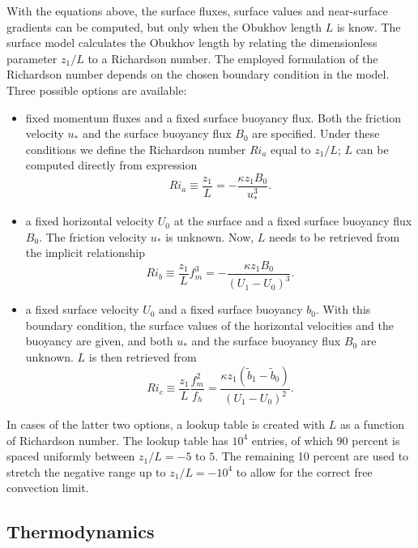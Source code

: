 \documentclass[gmd]{copernicus}
\begin{document}
With the equations above, the surface fluxes, surface values and near-surface gradients can be computed, but only when the Obukhov length $L$ is know. The surface model calculates the Obukhov length by relating the dimensionless parameter $z_1/ L$ to a Richardson number. The employed formulation of the Richardson number depends on the chosen boundary condition in the model. Three possible options are available:
\begin{itemize}
	\item fixed momentum fluxes and a fixed surface buoyancy flux. Both the friction velocity $u_*$ and the surface buoyancy flux $B_0$ are specified. Under these conditions we define the Richardson number $Ri_a$ equal to $z_1/L$; $L$ can be computed directly from expression
	\begin{equation}
	Ri_a \equiv \dfrac{z_1}{L} = - \dfrac{\kappa z_1 B_0}{u_*^3}.
	\end{equation}
	\item a fixed horizontal velocity $U_0$ at the surface and a fixed surface buoyancy flux $B_0$. The friction velocity $u_*$ is unknown. Now,  $L$ needs to be retrieved from the implicit relationship 
	\begin{equation}
	Ri_b \equiv \dfrac{z_1}{L} f_m^3 = - \dfrac{\kappa z_1 B_0}{ \left(U_1 - U_0 \right)^3}.
	\end{equation}
	\item a fixed surface velocity $U_0$ and a fixed surface buoyancy $b_0$. With this boundary condition, the surface values of the horizontal velocities and the buoyancy are given, and both $u_*$ and the surface buoyancy flux $B_0$ are unknown. $L$ is then retrieved from
	\begin{equation}
	Ri_c \equiv \dfrac{z_1}{L} \dfrac{f_m^2}{f_h} = \dfrac{\kappa z_1 \left(\widetilde{b}_1 - \widetilde{b}_0 \right)}{ \left(U_1 - U_0 \right)^2}.
	\end{equation}
\end{itemize}
In cases of the latter two options, a lookup table is created  with $L$ as a function of Richardson number. The lookup table has $10^4$ entries, of which 90 percent is spaced uniformly between $z_1/L = -5$ to $5$. The remaining 10 percent are used to stretch the negative range up to $z_1/L = -10^4$ to allow for the correct free convection limit.

\subsection{Thermodynamics}
\end{document}
